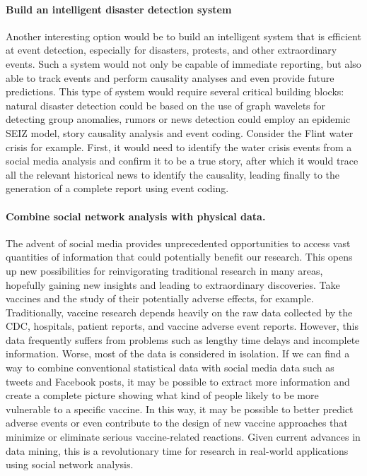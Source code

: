 \paragraph{Build an intelligent disaster detection system}
Another interesting option would be to build an intelligent system that is efficient at event detection, especially for disasters, protests, and other extraordinary events. Such a system would not only be capable of immediate reporting, but also able to track events and perform causality analyses and even provide future predictions. This type of system would require several critical building blocks: natural disaster detection could be based on the use of graph wavelets for detecting group anomalies, rumors or news detection could employ an epidemic SEIZ model, story causality analysis and event coding. Consider the Flint water crisis for example. First, it would need to identify the water crisis events from a social media analysis and confirm it to be a true story, after which it would trace all the relevant historical news to identify the causality, leading finally to the generation of a complete report using event coding.


\paragraph{Combine social network analysis with physical data.}
The advent of social media provides unprecedented opportunities to access vast quantities of information that could potentially benefit our research. This opens up new possibilities for reinvigorating traditional research in many areas, hopefully gaining new insights and leading to extraordinary discoveries. Take vaccines and the study of their potentially adverse effects, for example. Traditionally, vaccine research depends heavily on the raw data collected by the CDC, hospitals, patient reports, and vaccine adverse event reports. However, this data frequently suffers from problems such as lengthy time delays and incomplete information. Worse, most of the data is considered in isolation. If we can find a way to combine conventional statistical data with social media data such as tweets and Facebook posts, it may be possible to extract more information and create a complete picture showing what kind of people likely to be more vulnerable to a specific vaccine. In this way, it may be possible to better predict adverse events or even contribute to the design of new vaccine approaches that minimize or eliminate serious vaccine-related reactions. Given current advances in data mining, this is a revolutionary time for research in real-world applications using social network analysis.



